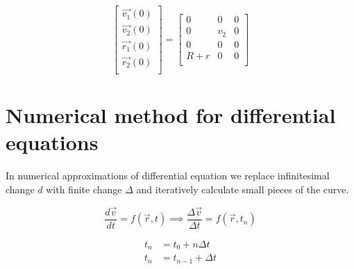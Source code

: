 \documentclass[english,12pt,a4paper, notitlepage]{report}
\begin{document}
	\begin{equation}
		\begin{bmatrix}
			\vec{v_1}(0)\\
			\vec{v_2}(0)\\
			\vec{r_1}(0)\\
			\vec{r_2}(0)\\
		\end{bmatrix}
		=
		\begin{bmatrix}
			0 & 0 & 0\\
			0 & v_2 & 0\\
			0 & 0 & 0\\
			R + r & 0 & 0\\
		\end{bmatrix}
	\end{equation}
	
	\chapter{Numerical method for differential equations}
	
	In numerical approximations of differential equation we replace infinitesimal change $d$ with finite change $\Delta$ and iteratively calculate small pieces of the curve.
	
	\begin{equation}\label{eq:num}
		\frac{d \vec{v}}{dt} = f(\vec{r}, t) \implies \frac{\Delta \vec{v}}{\Delta t} = f(\vec{r}, t_n)
	\end{equation}
	
	\begin{equation}
		\begin{split}
			t_n &= t_0 + n \Delta t \\
			t_n &= t_{n-1} + \Delta t
		\end{split}
	\end{equation}
	
\end{document}
